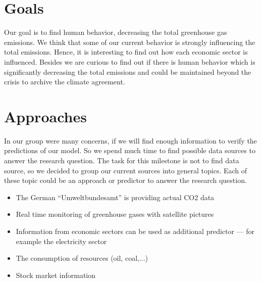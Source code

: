 \documentclass[lang=english,inputenc=utf8,fontsize=10pt]{ldvarticle}
\begin{document}
\section*{Goals}
Our goal is to find human behavior, decreasing the total greenhouse gas emissions. We think that some of our current behavior is strongly influencing the total emissions. Hence, it is interesting to find out how each economic sector is influenced. Besides we are curious to find out if there is human behavior which is significantly decreasing the total emissions and could be maintained beyond the crisis to archive the climate agreement.\\

\section*{Approaches}
In our group were many concerns, if we will find enough information to verify the predictions of our model. So we spend much time to find possible data sources to answer the research question. The task for this milestone is not to find data source, so we decided to group our current sources into general topics. Each of these topic could be an approach or predictor to answer the research question.\\

\begin{itemize}
    \item The German \enquote{Umweltbundesamt} is providing actual CO2 data
    \item Real time monitoring of greenhouse gases with satellite pictures
    \item Information from economic sectors can be used as additional predictor --- for example the electricity sector
    \item The consumption of resources (oil, coal,...)
    \item Stock market information
\end{itemize}

\newpage
\end{document}
